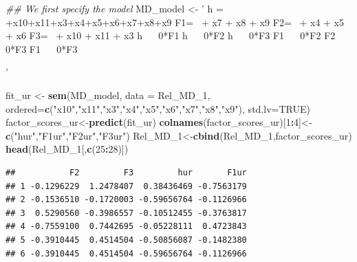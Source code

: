 \documentclass[]{book}
\newenvironment{Shaded}{\begin{snugshade}}{\end{snugshade}}
\newcommand{\CommentTok}[1]{\textcolor[rgb]{0.56,0.35,0.01}{\textit{#1}}}
\newcommand{\DataTypeTok}[1]{\textcolor[rgb]{0.13,0.29,0.53}{#1}}
\newcommand{\DecValTok}[1]{\textcolor[rgb]{0.00,0.00,0.81}{#1}}
\newcommand{\KeywordTok}[1]{\textcolor[rgb]{0.13,0.29,0.53}{\textbf{#1}}}
\newcommand{\NormalTok}[1]{#1}
\newcommand{\OperatorTok}[1]{\textcolor[rgb]{0.81,0.36,0.00}{\textbf{#1}}}
\newcommand{\OtherTok}[1]{\textcolor[rgb]{0.56,0.35,0.01}{#1}}
\newcommand{\StringTok}[1]{\textcolor[rgb]{0.31,0.60,0.02}{#1}}
\begin{document}
\begin{Shaded}
\begin{Highlighting}[]
\CommentTok{## We first specify the model}
\NormalTok{MD_model <-}\StringTok{ ' h =~ +x10+x11+x3+x4+x5+x6+x7+x8+x9 }
\StringTok{                F1=~  + x7 + x8 + x9        }
\StringTok{                F2=~  + x4 + x5 + x6         }
\StringTok{                F3=~  + x10 + x11 + x3}
\StringTok{                h  ~~ 0*F1}
\StringTok{                h  ~~ 0*F2}
\StringTok{                h  ~~ 0*F3}
\StringTok{                F1 ~~ 0*F2}
\StringTok{                F2 ~~ 0*F3}
\StringTok{                F1 ~~ 0*F3}

\StringTok{'}

\NormalTok{fit_ur <-}\StringTok{ }\KeywordTok{sem}\NormalTok{(MD_model, }\DataTypeTok{data =}\NormalTok{ Rel_MD_}\DecValTok{1}\NormalTok{, }
           \DataTypeTok{ordered=}\KeywordTok{c}\NormalTok{(}\StringTok{"x10"}\NormalTok{,}\StringTok{"x11"}\NormalTok{,}\StringTok{"x3"}\NormalTok{,}\StringTok{"x4"}\NormalTok{,}\StringTok{"x5"}\NormalTok{,}\StringTok{"x6"}\NormalTok{,}\StringTok{"x7"}\NormalTok{,}\StringTok{"x8"}\NormalTok{,}\StringTok{"x9"}\NormalTok{),}
           \DataTypeTok{std.lv=}\OtherTok{TRUE}\NormalTok{)}
\NormalTok{factor_scores_ur<-}\KeywordTok{predict}\NormalTok{(fit_ur)}
\KeywordTok{colnames}\NormalTok{(factor_scores_ur)[}\DecValTok{1}\OperatorTok{:}\DecValTok{4}\NormalTok{]<-}\KeywordTok{c}\NormalTok{(}\StringTok{"hur"}\NormalTok{,}\StringTok{"F1ur"}\NormalTok{,}\StringTok{"F2ur"}\NormalTok{,}\StringTok{"F3ur"}\NormalTok{)}
\NormalTok{Rel_MD_}\DecValTok{1}\NormalTok{<-}\KeywordTok{cbind}\NormalTok{(Rel_MD_}\DecValTok{1}\NormalTok{,factor_scores_ur)}
\KeywordTok{head}\NormalTok{(Rel_MD_}\DecValTok{1}\NormalTok{[,}\KeywordTok{c}\NormalTok{(}\DecValTok{25}\OperatorTok{:}\DecValTok{28}\NormalTok{)])}
\end{Highlighting}
\end{Shaded}

\begin{verbatim}
##           F2         F3         hur       F1ur
## 1 -0.1296229  1.2478407  0.38436469 -0.7563179
## 2 -0.1536510 -0.1720003 -0.59656764 -0.1126966
## 3  0.5290560 -0.3986557 -0.10512455 -0.3763817
## 4 -0.7559100  0.7442695 -0.05228111  0.4723843
## 5 -0.3910445  0.4514504 -0.50856087 -0.1482380
## 6 -0.3910445  0.4514504 -0.59656764 -0.1126966
\end{verbatim}
\end{document}
